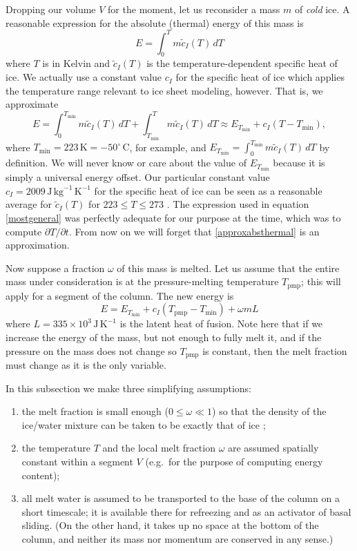 \documentclass[12pt,final]{amsart}%
\theoremstyle{plain}
\theoremstyle{definition}
\theoremstyle{remark}
\newcommand{\Tpmp}{T_{\text{pmp}}}
\begin{document}
Dropping our volume $V$ for the moment, let us reconsider a mass $m$ of \emph{cold} ice.  A reasonable expression for the absolute (thermal) energy of this mass is
    $$E = \int_{0}^T m \tilde c_I(T)\,dT$$
where $T$ is in Kelvin and $\tilde c_I(T)$ is the temperature-dependent specific heat of ice.  We actually use a constant value $c_I$ for the specific heat of ice which applies the temperature range relevant to ice sheet modeling, however.  That is, we approximate
\begin{equation}\label{approxabsthermal}
E = \int_{0}^{T_{\min}} m \tilde c_I(T)\,dT + \int_{T_{\min}}^T m \tilde c_I(T)\,dT\approx E_{T_{\min}} + c_I (T-T_{\min}),
\end{equation}
where $T_{\min} = 223 \,\text{K} = - {50}^\circ\, \text{C}$, for example, and $E_{T_{\min}} = \int_{0}^{T_{\min}} m \tilde c_I(T)\,dT$ by definition.  We will never know or care about the value of $E_{T_{\min}}$ because it is simply a universal energy offset.  Our particular constant value $c_I = 2009\, \text{J}\, \text{kg}^{-1}\, \text{K}^{-1}$ for the specific heat of ice can be seen as a reasonable average for $\tilde c_I(T)$ for $223 \le T \le 273$ \citep[compare][page 205]{Paterson}.  The expression used in equation \eqref{mostgeneral} was perfectly adequate for our purpose at the time, which was to compute $\partial T/\partial t$.  From now on we will forget that \eqref{approxabsthermal} is an approximation.

Now suppose a fraction $\omega$ of this mass is melted.  Let us assume that the entire mass under consideration is at the pressure-melting temperature $\Tpmp$; this will apply for a segment of the column.  The new energy is
    $$E = E_{T_{\min}} + c_I (\Tpmp-T_{\min}) + \omega m L$$
where $L = 335 \times 10^3 \,\text{J}\,\text{K}^{-1}$ is the latent heat of fusion.  Note here that if we increase the energy of the mass, but not enough to fully melt it, and if the pressure on the mass does not change so $\Tpmp$ is constant, then the melt fraction must change as it is the only variable.

In this subsection we make three simplifying assumptions:\renewcommand{\labelenumi}{\emph{\roman{enumi}}) }
\begin{enumerate}
\item the melt fraction is small enough ($0\le \omega \ll 1$) so that the density of the ice/water mixture can be taken to be exactly that of ice \citep{Greve};
\item the temperature $T$ and the local melt fraction $\omega$ are assumed spatially constant within a segment $V$ (e.g.~for the purpose of computing energy content);
\item all melt water is assumed to be transported to the base of the column on a short timescale; it is available there for refreezing and as an activator of basal sliding.  (On the other hand, it takes up no space at the bottom of the column, and neither its mass nor momentum are conserved in any sense.)
\end{enumerate}
\end{document}
